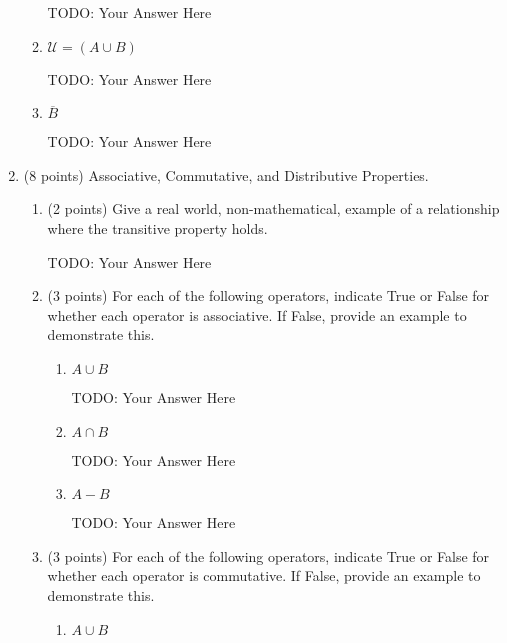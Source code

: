 \documentclass{article}
\begin{document}
\begin{enumerate}
\begin{enumerate}
        {\color{red} TODO: Your Answer Here}
        
        \item $\mathcal{U} = (A\cup B) $
            
        {\color{red} TODO: Your Answer Here}
        
        \item $\overline{B}  $
             
        {\color{red} TODO: Your Answer Here}
        
    \end{enumerate}
    
    \item{\large (8 points) Associative, Commutative, and Distributive Properties. }
    \begin{enumerate}
        \item (2 points) Give a real world, non-mathematical, example of a relationship where the transitive property holds.  
             
        {\color{red} TODO: Your Answer Here}
        
        \item (3 points) For each of the following operators, indicate True or False for whether each operator is associative. If False, provide an example to demonstrate this.
            \begin{enumerate}
                \item $A\cup B$
                     
        {\color{red} TODO: Your Answer Here}
        
                \item $A\cap B$
                     
        {\color{red} TODO: Your Answer Here}
        
                \item $A - B$
                     
        {\color{red} TODO: Your Answer Here}
        

            \end{enumerate}
        \item (3 points) For each of the following operators, indicate True or False for whether each operator is commutative. If False, provide an example to demonstrate this.
            \begin{enumerate}
                \item $A\cup B$
                     

\end{enumerate}
\end{enumerate}
\end{enumerate}
\end{document}
